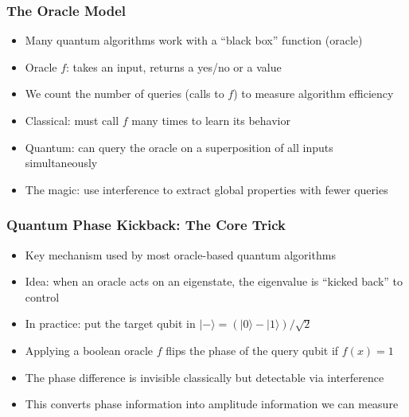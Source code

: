 \begin{frame}[fragile]\frametitle{The Oracle Model}
\begin{itemize}
\item Many quantum algorithms work with a ``black box'' function (oracle)
\item Oracle $f$: takes an input, returns a yes/no or a value
\item We count the number of queries (calls to $f$) to measure algorithm efficiency
\item Classical: must call $f$ many times to learn its behavior
\item Quantum: can query the oracle on a superposition of all inputs simultaneously
\item The magic: use interference to extract global properties with fewer queries
\end{itemize}
\end{frame}

\begin{frame}[fragile]\frametitle{Quantum Phase Kickback: The Core Trick}
\begin{itemize}
\item Key mechanism used by most oracle-based quantum algorithms
\item Idea: when an oracle acts on an eigenstate, the eigenvalue is ``kicked back'' to control
\item In practice: put the target qubit in $|-\rangle = (|0\rangle - |1\rangle)/\sqrt{2}$
\item Applying a boolean oracle $f$ flips the phase of the query qubit if $f(x)=1$
\item The phase difference is invisible classically but detectable via interference
\item This converts phase information into amplitude information we can measure
\end{itemize}
\end{frame}

